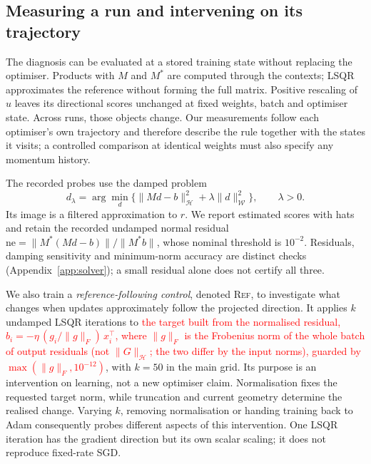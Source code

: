 \documentclass{article}
\newcommand{\nat}[1]{\textcolor{red}{#1}}
\newcommand{\TOU}{\textsc{Ref}}
\theoremstyle{definition}
\theoremstyle{remark}
\begin{document}
\subsection{Measuring a run and intervening on its trajectory}
\label{sec:numerics}

The diagnosis can be evaluated at a stored training state without replacing the optimiser. Products with $M$ and $M^*$ are computed through the contexts; LSQR \citep{paige1982lsqr} approximates the reference without forming the full matrix. Positive rescaling of $u$ leaves its directional scores unchanged at fixed weights, batch and optimiser state. Across runs, those objects change. Our measurements follow each optimiser's own trajectory and therefore describe the rule together with the states it visits; a controlled comparison at identical weights must also specify any momentum history.

The recorded probes use the damped problem
\begin{equation}
 d_\lambda=\arg\min_d\{\|Md-b\|_{\mathcal H}^2+\lambda\|d\|_{\mathcal W}^2\},
 \qquad\lambda>0.
 \label{eq:damped}
\end{equation}
Its image is a filtered approximation to $r$. We report estimated scores with hats and retain the recorded undamped normal residual $\mathrm{ne}=\|M^*(Md-b)\|/\|M^*b\|$, whose nominal threshold is $10^{-2}$. Residuals, damping sensitivity and minimum-norm accuracy are distinct checks (Appendix~\ref{app:solver}); a small residual alone does not certify all three.

We also train a \emph{reference-following control}, denoted \TOU, to investigate what changes when updates approximately follow the projected direction. It applies $k$ undamped LSQR iterations to \nat{the target built from the normalised residual, $b_i=-\eta\,(g_i/\|g\|_F)\,x_i^\top$, where $\|g\|_F$ is the Frobenius norm of the whole batch of output residuals (not $\|G\|_{\mathcal H}$; the two differ by the input norms), guarded by $\max(\|g\|_F,10^{-12})$}, with $k=50$ in the main grid. Its purpose is an intervention on learning, not a new optimiser claim. Normalisation fixes the requested target norm, while truncation and current geometry determine the realised change. Varying $k$, removing normalisation or handing training back to Adam consequently probes different aspects of this intervention. One LSQR iteration has the gradient direction but its own scalar scaling; it does not reproduce fixed-rate SGD.
\end{document}
